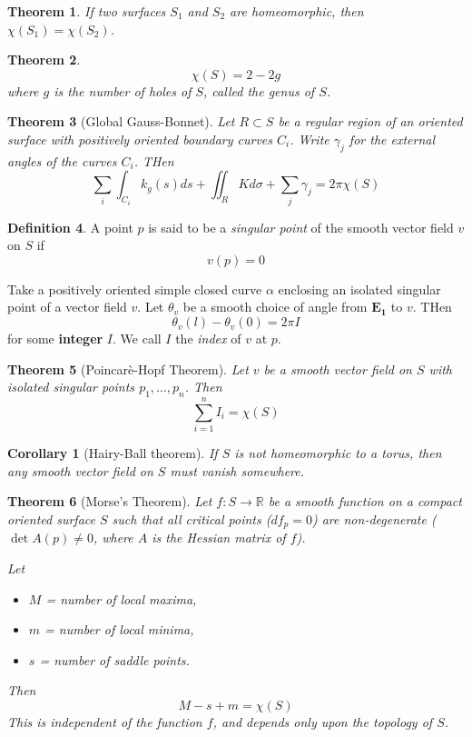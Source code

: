 \documentclass[10pt, oneside, reqno]{amsart}
\newcommand{\R}{\mathbb{R}}
\theoremstyle{plain}%
\newtheorem{thm}{Theorem}[section]
\newtheorem*{cor}{Corollary}
\theoremstyle{definition}
\newtheorem{defn}[thm]{Definition}
\theoremstyle{remark}
\begin{document}
\begin{thm}
	If two surfaces $S_1$ and $S_2$ are homeomorphic, then $\chi(S_1) = \chi(S_2)$.
\end{thm}

\begin{thm}
	\[\chi(S) = 2 - 2g \]
	where $g$ is the number of holes of $S$, called the \emph{genus} of $S$.
\end{thm}

\begin{thm}[Global Gauss-Bonnet]
	Let $R \subset S$ be a regular region of an oriented surface with positively oriented boundary curves $C_i$. Write $\gamma_j$ for the external angles of the curves $C_i$.  THen \[
		\sum_{i} \int_{C_i} k_g(s) ds + \iint_R K d \sigma + \sum_j \gamma_j = 2 \pi \chi(S)
	\]
\end{thm}


\begin{defn}
	A point $p$ is said to be a \emph{singular point} of the smooth vector field $v$ on $S$ if \[
		v(p) = 0
	\]
	
	Take a positively oriented simple closed curve $\alpha$ enclosing an isolated singular point of a vector field $v$.  Let $\theta_v$ be a smooth choice of angle from $\mathbf{E_1}$ to $v$.  THen \[
		\theta_v(l) - \theta_v(0) = 2 \pi I
	\]
	for some \textbf{integer} $I$.  We call $I$ the \emph{index} of $v$ at $p$.
\end{defn}

\begin{thm}[Poincar\`{e}-Hopf Theorem]
	Let $v$ be a smooth vector field on $S$ with isolated singular points $p_1,\dots, p_n$.  Then \[
		\sum_{i=1}^n I_i = \chi(S)
	\]
\end{thm}

\begin{cor}[Hairy-Ball theorem]
	If $S$ is not homeomorphic to a torus, then any smooth vector field on $S$ must vanish somewhere.
\end{cor}

\begin{thm}[Morse's Theorem]
	Let $f: S \rightarrow \R$ be a smooth function on a compact oriented surface $S$ such that all critical points ($df_p = 0$) are non-degenerate ($\det A(p) \neq 0$, where $A$ is the \emph{Hessian} matrix of $f$).

Let
\begin{itemize}

	\item 	$M$ = number of local maxima, 

	\item 	$m$ = number of local minima, 

	\item 	$s$ = number of saddle points.

\end{itemize}
	
	Then \[
		M - s + m = \chi(S)
	\]
	This is independent of the function $f$, and depends only upon the topology of $S$.
\end{thm}
\end{document}
